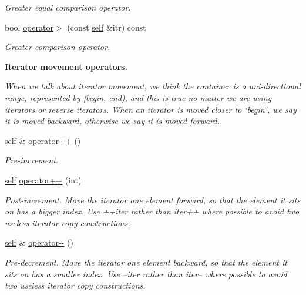 \begin{Indent}
\begin{DoxyCompactItemize}
\begin{DoxyCompactList}\small\item\em Greater equal comparison operator. \end{DoxyCompactList}\item 
bool \mbox{\hyperlink{classGis__wkb__vector__const__iterator_a7c480b8dd9b3e51719533ea13c3223cd}{operator$>$}} (const \mbox{\hyperlink{classGis__wkb__vector__const__iterator}{self}} \&itr) const
\begin{DoxyCompactList}\small\item\em Greater comparison operator. \end{DoxyCompactList}\end{DoxyCompactItemize}
\end{Indent}
\begin{Indent}\textbf{ Iterator movement operators.}\par
{\em When we talk about iterator movement, we think the container is a uni-\/directional range, represented by \mbox{[}begin, end), and this is true no matter we are using iterators or reverse iterators. When an iterator is moved closer to \char`\"{}begin\char`\"{}, we say it is moved backward, otherwise we say it is moved forward. }\begin{DoxyCompactItemize}
\item 
\mbox{\hyperlink{classGis__wkb__vector__const__iterator}{self}} \& \mbox{\hyperlink{classGis__wkb__vector__const__iterator_a9cf0ed3395c51ed8c7280d0184b7ce66}{operator++}} ()
\begin{DoxyCompactList}\small\item\em Pre-\/increment. \end{DoxyCompactList}\item 
\mbox{\hyperlink{classGis__wkb__vector__const__iterator}{self}} \mbox{\hyperlink{classGis__wkb__vector__const__iterator_a82e26fad2ec2115454fbfeb90675f42c}{operator++}} (int)
\begin{DoxyCompactList}\small\item\em Post-\/increment. Move the iterator one element forward, so that the element it sits on has a bigger index. Use ++iter rather than iter++ where possible to avoid two useless iterator copy constructions. \end{DoxyCompactList}\item 
\mbox{\hyperlink{classGis__wkb__vector__const__iterator}{self}} \& \mbox{\hyperlink{classGis__wkb__vector__const__iterator_a62e9c9573e8e44a8521f845da62f0cb2}{operator-\/-\/}} ()
\begin{DoxyCompactList}\small\item\em Pre-\/decrement. Move the iterator one element backward, so that the element it sits on has a smaller index. Use --iter rather than iter-- where possible to avoid two useless iterator copy constructions. \end{DoxyCompactList}\item 

\end{DoxyCompactItemize}
\end{Indent}
